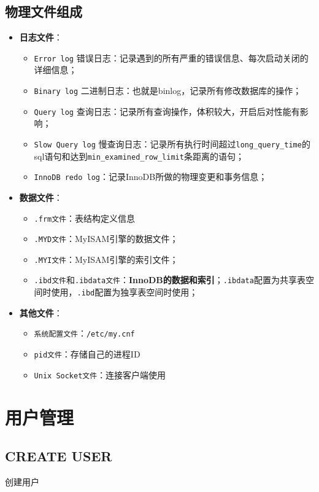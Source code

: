 \documentclass[UTF8,a4paper,12pt]{ctexbook}
\begin{document}
		\subsection{物理文件组成}
			\begin{itemize}
				\item \textbf{日志文件}：
				\begin{itemize}
					\item \verb|Error log| 错误日志：记录遇到的所有严重的错误信息、每次启动关闭的详细信息；
					\item \verb|Binary log| 二进制日志：也就是binlog，记录所有修改数据库的操作；
					\item \verb|Query log| 查询日志：记录所有查询操作，体积较大，开启后对性能有影响；
					\item \verb|Slow Query log| 慢查询日志：记录所有执行时间超过\verb|long_query_time|的sql语句和达到\verb|min_examined_row_limit|条距离的语句；
					\item \verb|InnoDB redo log|：记录InnoDB所做的物理变更和事务信息；
				\end{itemize}
				
				\item \textbf{数据文件}：
				\begin{itemize}
					\item \verb|.frm文件|：表结构定义信息
					\item \verb|.MYD文件|：MyISAM引擎的数据文件；
					\item \verb|.MYI文件|：MyISAM引擎的索引文件；
					\item \verb|.ibd文件|和\verb|.ibdata文件|：\textbf{InnoDB的数据和索引}；\verb|.ibdata|配置为共享表空间时使用，\verb|.ibd|配置为独享表空间时使用；
				\end{itemize}
				
				\item \textbf{其他文件}：
				\begin{itemize}
					\item \verb|系统配置文件|：\verb|/etc/my.cnf|
					\item \verb|pid文件|：存储自己的进程ID
					\item \verb|Unix Socket文件|：连接客户端使用
				\end{itemize}
			\end{itemize}
		
	\section{用户管理}
		\subsection{CREATE USER}
			创建用户
			
\end{document}
